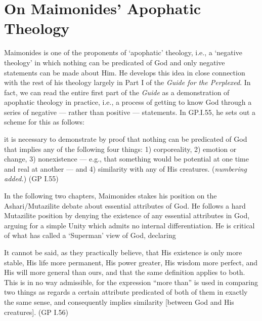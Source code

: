 \documentclass[12pt]{article}
\begin{document}
\section*{On Maimonides' Apophatic Theology}

Maimonides is one of the proponents of `apophatic' theology, i.e., a `negative theology' in which nothing can be predicated of God and only negative statements can be made about Him. He develops this idea in close connection with the rest of his theology largely in Part I of the \textit{Guide for the Perplexed}. In fact, we can read the entire first part of the \textit{Guide} as a demonstration of apophatic theology in practice, i.e., a process of getting to know God through a series of negative --- rather than positive --- statements. In GP.I.55, he sets out a scheme for this as follows:
\begin{displayquote}
	it is necessary to demonstrate by proof that nothing can be predicated of God that implies any of the following four things: 1) corporeality, 2) emotion or change, 3) nonexistence --- e.g., that something would be potential at one time and real at another --- and 4) similarity with any of His creatures. \quad (\textit{numbering added.}) \hfill (GP I.55)
\end{displayquote}

In the following two chapters, Maimonides stakes his position on the Ashari/Mutazilite debate about essential attributes of God. He follows a hard Mutazilite position by denying the existence of any essential attributes in God, arguing for a simple Unity which admits no internal differentiation. He is critical of what \citeauthor{leaman2013moses} has called a `Superman' view of God, declaring
\begin{displayquote}
	It cannot be said, as they practically believe, that His existence is only more stable, His life more permanent, His power greater, His wisdom more perfect, and His will more general than ours, and that the same definition applies to both. This is in no way admissible, for the expression “more than” is used in comparing two things as regards a certain attribute predicated of both of them in exactly the same sense, and consequently implies similarity [between God and His creatures]. \hfill (GP I.56)
\end{displayquote}
\end{document}
